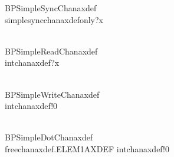 \begin{circus}
 \circprocess BPSimpleSyncChanaxdef \circdef \circbegin \\
    \circspot simplesyncchanaxdefonly?x \then \Skip \\
 \circend \\
\end{circus}
\begin{circus}
 \circprocess BPSimpleReadChanaxdef \circdef \circbegin \\
    \circspot intchanaxdef?x \then \Skip \\
 \circend \\
\end{circus}

\begin{circus}
 \circprocess BPSimpleWriteChanaxdef \circdef \circbegin \\
    \circspot intchanaxdef!0 \then \Skip \\
 \circend \\
\end{circus}

\begin{circus} 
 \circprocess BPSimpleDotChanaxdef \circdef \circbegin \\
    \circspot freechanaxdef.ELEM1AXDEF \then intchanaxdef!0 \then \Skip \\
 \circend \\
\end{circus}


